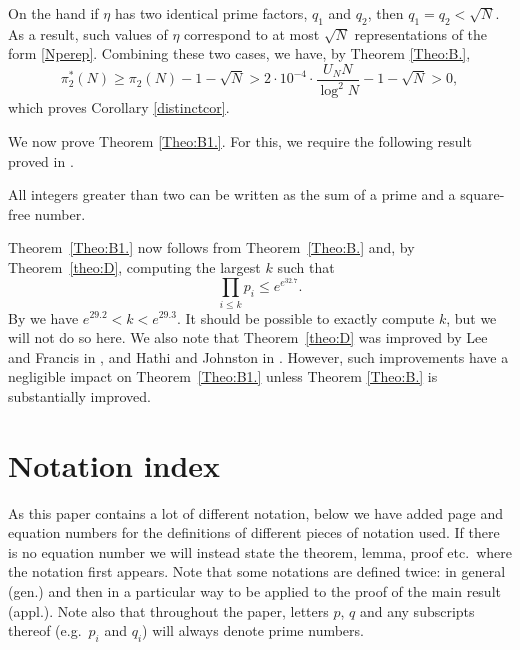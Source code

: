 \documentclass[12pt]{amsart}
\begin{document}
On the hand if $\eta$ has two identical prime factors, $q_1$ and $q_2$, then $q_1=q_2<\sqrt{N}$. As a result, such values of $\eta$ correspond to at most $\sqrt{N}$ representations of the form \eqref{Nperep}. Combining these two cases, we have, by Theorem \ref{Theo:B.},
\begin{equation*}
    \pi_2^*(N)\ge\pi_2(N)-1-\sqrt{N}>2\cdot 10^{-4}\cdot\frac{U_N N}{\log^2 N}-1-\sqrt{N}>0,
\end{equation*}
which proves Corollary \ref{distinctcor}.

We now prove Theorem \ref{Theo:B1.}. For this, we require the following result proved in \cite{Dudek1}.
\begin{theorem}[Dudek]
\label{theo:D}
All integers greater than two can be written as the sum of a prime and a square-free number.
\end{theorem} 
Theorem~\ref{Theo:B1.} now follows from Theorem~\ref{Theo:B.} and, by Theorem~\ref{theo:D}, computing the largest $k$ such that
\begin{equation*}
\prod_{i \le k} p_i \le e^{e^{32.7}}.
\end{equation*}
By \cite[Theorems 3 \& 4]{R-S} we have $e^{29.2}<k< e^{29.3}$. It should be possible to exactly compute $k$, but we will not do so here. We also note that Theorem~\ref{theo:D} was improved by Lee and Francis in \cite{Forrest}, and Hathi and Johnston in \cite{H_J_21}. However, such improvements have a negligible impact on Theorem~\ref{Theo:B1.} unless Theorem \ref{Theo:B.} is substantially improved.\par

\section{Notation index}\label{sectnot}
{As this paper contains a lot of different notation, below we have added page and equation numbers for the definitions of different pieces of notation used. If there is no equation number we will instead state the theorem, lemma, proof etc.\ where the notation first appears. Note that some notations are defined twice: in general (gen.) and then in a particular way to be applied to the proof of the main result (appl.). Note also that throughout the paper, letters $p$, $q$ and any subscripts thereof (e.g.\ $p_i$ and $q_i$) will always denote prime numbers.}
\end{document}
